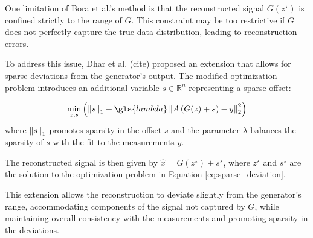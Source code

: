 One limitation of Bora et al.'s method is that the reconstructed signal $G(z^{\star})$ is confined strictly to the range of $G$.
This constraint may be too restrictive if $G$ does not perfectly capture the true data distribution, leading to reconstruction errors.

To address this issue, Dhar et al. (cite) proposed an extension that allows for sparse deviations from the generator's output.
The modified optimization problem introduces an additional variable $s \in \mathbb{R}^n$ representing a sparse offset:

\begin{equation}
    \min_{z, s}{\left(\norm{s}_1 + \gls{lambda} \norm{A \left( G(z) + s \right) - y}_2^2 \right)}
    \label{eq:sparse_deviation}
\end{equation}
where $\left\lVert s\right\rVert_1$ promotes sparsity in the offset $s$ and the parameter $\lambda$ balances the sparsity of $s$ with the fit to the measurements $y$.

The reconstructed signal is then given by $\hat{x} = G(z^\star) + s^\star$, where $z^\star$ and $s^\star$ are the solution to the optimization problem in Equation \ref{eq:sparse_deviation}.

This extension allows the reconstruction to deviate slightly from the generator's range, accommodating components of the signal not captured by $G$, while maintaining overall consistency with the measurements and promoting sparsity in the deviations.


